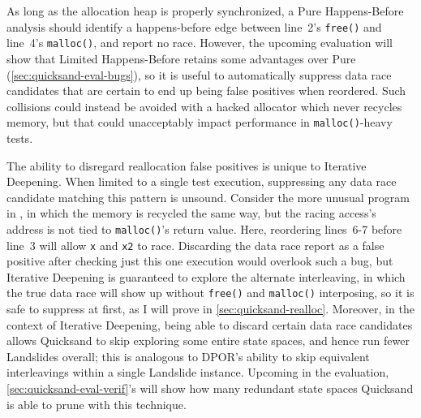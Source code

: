 As long as the allocation heap is properly synchronized,
a Pure Happens-Before analysis should identify a happens-before edge
between line~2's {\tt free()} and line~4's {\tt malloc()},
and report no race.
However, the upcoming evaluation will show that Limited Happens-Before retains some advantages over Pure
(\cref{sec:quicksand-eval-bugs}),
so it is useful to
automatically suppress data race candidates
that are certain to end up being false positives when reordered.
Such collisions could instead be avoided with a hacked allocator which never recycles memory,
but that could unacceptably impact performance in {\tt malloc()}-heavy tests.

The ability to disregard reallocation false positives is unique to Iterative Deepening.
When limited to a single test execution, suppressing any data race candidate matching this pattern is unsound.
Consider the more unusual program in ,
in which the memory is recycled the same way, but the racing access's address is not tied to {\tt malloc()}'s return value.
Here, reordering lines~6-7 before line~3 will allow {\tt x} and {\tt x2} to race.
Discarding the data race report as a false positive after checking just this one execution
would overlook such a bug,
but Iterative Deepening is guaranteed to explore the alternate interleaving,
in which the true data race will show up without {\tt free()} and {\tt malloc()} interposing,
so it is safe to suppress at first, as I will prove in \cref{sec:quicksand-realloc}.
Moreover,
in the context of Iterative Deepening, being able to discard certain data race candidates
allows Quicksand to skip exploring some entire state spaces,
and hence run fewer Landslides overall;
this is analogous to DPOR's ability to skip equivalent interleavings within a single Landslide instance.
Upcoming in the evaluation, \cref{sec:quicksand-eval-verif}'s 
will show how many redundant state spaces Quicksand is able to prune with this technique.

